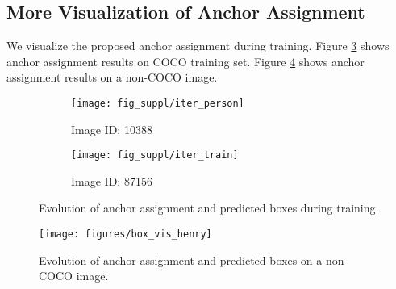 \documentclass[runningheads]{llncs}
\begin{document}
\subsection{More Visualization of Anchor Assignment}
We visualize the proposed anchor assignment during training. Figure \ref{vis:anchors} shows anchor assignment results on COCO training set. Figure \ref{vis:anchors_henry} shows anchor assignment results on a non-COCO image.
\begin{figure}[t]
    \centering
    \begin{subfigure}{.85\textwidth}
		\texttt{[image: fig\_suppl/iter\_person]}
	    \caption{Image ID: 10388}
	    \label{fig_box_vis_person}
    \end{subfigure}
    \centering
    \begin{subfigure}{.85\textwidth}
		\texttt{[image: fig\_suppl/iter\_train]}
	    \caption{Image ID: 87156}
	    \label{fig_box_vis_train}
    \end{subfigure}    
\caption{Evolution of anchor assignment and predicted boxes during training.}
\label{vis:anchors}
\end{figure}
\begin{figure}[t]
    \begin{center}
		\texttt{[image: figures/box\_vis\_henry]}
	\end{center}
    \caption{Evolution of anchor assignment and predicted boxes on a non-COCO image.}
    \label{vis:anchors_henry}
\end{figure}
\end{document}
